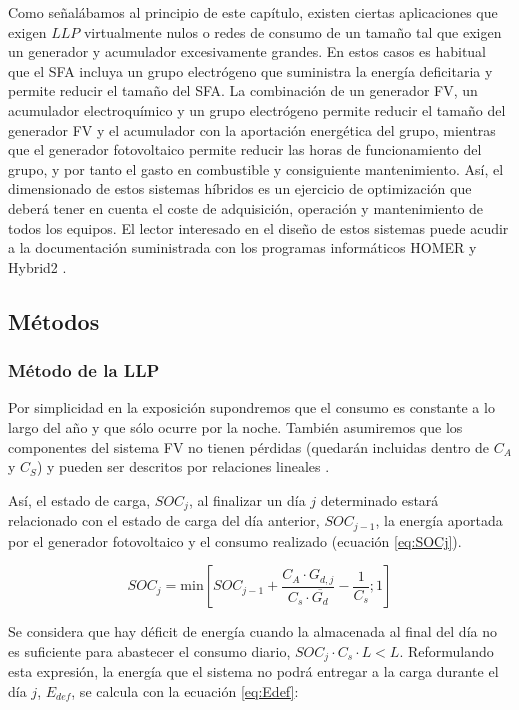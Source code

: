 Como señalábamos al principio de este capítulo, existen ciertas aplicaciones
que exigen $LLP$ virtualmente nulos o redes de consumo de un tamaño
tal que exigen un generador y acumulador excesivamente grandes. En
estos casos es habitual que el SFA incluya un grupo electrógeno que
suministra la energía deficitaria y permite reducir el tamaño del
SFA. La combinación de un generador FV, un acumulador electroquímico
y un grupo electrógeno permite reducir el tamaño del generador FV
y el acumulador con la aportación energética del grupo, mientras que
el generador fotovoltaico permite reducir las horas de funcionamiento
del grupo, y por tanto el gasto en combustible y consiguiente mantenimiento.
Así, el dimensionado de estos sistemas híbridos es un ejercicio de
optimización que deberá tener en cuenta el coste de adquisición, operación
y mantenimiento de todos los equipos. El lector interesado en el diseño
de estos sistemas puede acudir a la documentación suministrada con
los programas informáticos HOMER \citep{Homer-Energy} y Hybrid2 \citep{Hybrid2}.




\subsection{Métodos}


\subsubsection{Método de la LLP}

Por simplicidad en la exposición supondremos que el consumo es constante
a lo largo del año y que sólo ocurre por la noche. También asumiremos
que los componentes del sistema FV no tienen pérdidas (quedarán incluidas
dentro de $C_{A}$ y $C_{S}$) y pueden ser descritos por relaciones
lineales \citep{Lorenzo.Narvarte2000}.

Así, el estado de carga, $SOC_{j}$, al finalizar un día $j$ determinado
estará relacionado con el estado de carga del día anterior, $SOC_{j-1}$,
la energía aportada por el generador fotovoltaico y el consumo realizado
(ecuación \ref{eq:SOCj}).

\begin{equation}
SOC_{j}=\mathrm{min}[SOC_{j-1}+\frac{C_{A}\cdot G_{d,j}}{C_{s}\cdot\overline{G_{d}}}-\frac{1}{C_{s}};1]\label{eq:SOCj}\end{equation}


Se considera que hay déficit de energía cuando la almacenada al final
del día no es suficiente para abastecer el consumo diario, $SOC_{j}\cdot C_{s}\cdot L<L$.
Reformulando esta expresión, la energía que el sistema no podrá entregar
a la carga durante el día $j$, $E_{def}$, se calcula con la ecuación
\ref{eq:Edef}:

